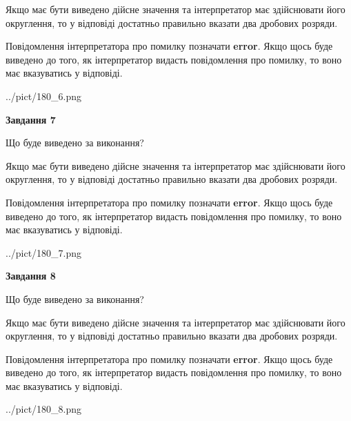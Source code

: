 \documentclass[12pt, ukrainian]{article}
\begin{document}
{\begin {Large}
Якщо має бути виведено дійсне значення та інтерпретатор має здійснювати його округлення, 
то у відповіді достатньо правильно вказати два дробових розряди.

Повідомлення інтерпретатора про помилку позначати \textbf{error}.
Якщо щось буде виведено до того, як інтерпретатор видасть повідомлення про помилку, 
то воно має вказуватись у відповіді. \par

\begin{center}
	{../pict/180_6.png}
\end{center}
\newpage

{\begin {center}\textbf{Завдання 7}\end {center}}\par
Що буде виведено за виконання? \par

Якщо має бути виведено дійсне значення та інтерпретатор має здійснювати його округлення, 
то у відповіді достатньо правильно вказати два дробових розряди.

Повідомлення інтерпретатора про помилку позначати \textbf{error}.
Якщо щось буде виведено до того, як інтерпретатор видасть повідомлення про помилку, 
то воно має вказуватись у відповіді. \par

\begin{center}
	{../pict/180_7.png}
\end{center}
\newpage

{\begin {center}\textbf{Завдання 8}\end {center}}\par
Що буде виведено за виконання? \par

Якщо має бути виведено дійсне значення та інтерпретатор має здійснювати його округлення, 
то у відповіді достатньо правильно вказати два дробових розряди.

Повідомлення інтерпретатора про помилку позначати \textbf{error}.
Якщо щось буде виведено до того, як інтерпретатор видасть повідомлення про помилку, 
то воно має вказуватись у відповіді. \par

\begin{center}
	{../pict/180_8.png}
\end{center}
\newpage


\end{Large}}
\end{document}
